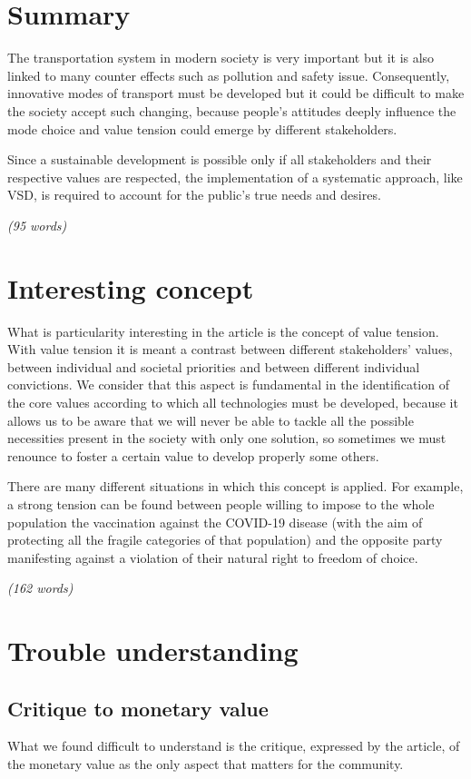 \section{Summary}
The transportation system in modern society is very important but it is also linked to many counter effects such as pollution and safety issue. Consequently, innovative modes of transport must be developed but it could be difficult to make the society accept such changing, because people’s attitudes deeply influence the mode choice and value tension could emerge by different stakeholders.

Since a sustainable development is possible only if all stakeholders and their respective values are respected, the implementation of a systematic approach, like VSD, is required to account for the public’s true needs and desires.

\emph{(95 words)}

\section{Interesting concept}
What is particularity interesting in the article is the concept of value tension.
With value tension it is meant a contrast between different stakeholders’ values, between individual and societal priorities and between different individual convictions. We consider that this aspect is fundamental in the identification of the core values according to which all technologies must be developed, because it allows us to be aware that we will never be able to tackle all the possible necessities present in the society with only one solution, so sometimes we must renounce to foster a certain value to develop properly some others. 

There are many different situations in which this concept is applied. For example, a strong tension can be found between people willing to impose to the whole population the vaccination against the COVID-19 disease (with the aim of protecting all the fragile categories of that population) and the opposite party manifesting against a violation of their natural right to freedom of choice.

\emph{(162 words)}

\section{Trouble understanding}
\subsection{Critique to monetary value}
What we found difficult to understand is the critique, expressed by the article, of the monetary value as the only aspect that matters for the community.

